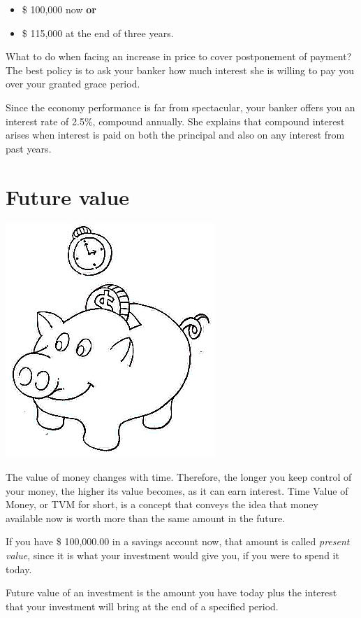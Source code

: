\documentclass[a4paper,12pt]{book}
\begin{document}
\begin{itemize}
\item \$ 100,000 now {\bf or}
\item \$ 115,000 at the end of three years.
\end{itemize}

What to do when facing an increase in price
to cover postponement of payment? The best
policy is to ask your banker how much interest
she is willing to pay you over your
granted grace period.

Since the economy performance is far
from spectacular, your banker offers you
an interest rate of 2.5\%, compound annually.
She explains that compound interest arises
when interest is paid on both the principal
and also on any interest from past years.

\section{Future value}

\includegraphics{figs-prefix/piggy.jpg}

The value of money changes with time. Therefore,
the longer you keep control of your money,
the higher its value becomes, as it can earn
interest. Time Value of Money, or TVM for short,
is a concept that conveys the idea that money
available now is worth more than the same
amount in the future.

If you have \$ 100,000.00 in a savings account
now, that amount is called {\em present value},
since it is what your investment would give you,
if you were to spend it today.

Future value of an investment is the amount
you have today plus the interest that your
investment will bring at the end of a
specified period.
\end{document}
